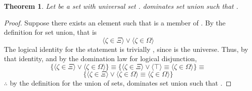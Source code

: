 \documentclass[preview]{standalone}
\newtheorem{theorem}{Theorem}
\begin{document}
\begin{theorem} %
    Let \bm{$\Xi$} be a set with universal set \bm{$\Omega$}. 
    \bm{$\Omega$} dominates set union such that 
    \bm{$\Xi \cup \Omega = \Omega$}.
\end{theorem}
\begin{proof}
    Suppose there exists an element \bm{$\zeta$} such that \bm{$\zeta$} is a member of 
    \bm{$\Xi \cup \Omega$}. 
    By the definition for set union, that is
    \begin{equation*}
        \Big \langle \zeta \in \Xi \Big \rangle
            \lor 
        \Big \langle \zeta \in \Omega \Big \rangle
    \end{equation*}
    The logical identity for the statement \bm{$\zeta \in \Omega$} is trivially \bm{$\top$}, 
    since \bm{$\Omega$} is the universe. 
    Thus, 
    by that identity, 
    and by the domination law for logical disjunction,
    \begin{equation*}
        \Bigg\{
            \Big \langle \zeta \in \Xi \Big \rangle 
                \lor 
            \Big \langle \zeta \in \Omega \Big \rangle
        \Bigg\}
            \equiv
        \Bigg\{
            \Big \langle \zeta \in \Xi \Big \rangle 
                \lor 
            \Big \langle \top \Big \rangle
                \equiv
            \Big \langle \zeta \in \Omega \Big \rangle
        \Bigg\}
            \equiv
    \end{equation*}
    \begin{equation*}
        \Bigg\{
            \Big \langle \zeta \in \Xi \Big \rangle 
                \lor 
            \Big \langle \zeta \in \Omega \Big \rangle
                \equiv
            \Big \langle \zeta \in \Omega \Big \rangle
        \Bigg\}
    \end{equation*}
    $\therefore$ by the definition for the union of sets, 
    \bm{$\Omega$} dominates set union such that 
    \bm{$\Xi \cup \Omega = \Omega$}.
\end{proof}
\end{document}
